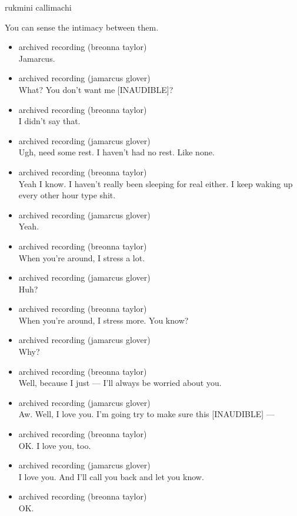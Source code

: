 rukmini callimachi

You can sense the intimacy between them.

\begin{itemize}
\item
  archived recording (breonna taylor)\\
  Jamarcus.
\item
  archived recording (jamarcus glover)\\
  What? You don't want me {[}INAUDIBLE{]}?
\item
  archived recording (breonna taylor)\\
  I didn't say that.
\item
  archived recording (jamarcus glover)\\
  Ugh, need some rest. I haven't had no rest. Like none.
\item
  archived recording (breonna taylor)\\
  Yeah I know. I haven't really been sleeping for real either. I keep
  waking up every other hour type shit.
\item
  archived recording (jamarcus glover)\\
  Yeah.
\item
  archived recording (breonna taylor)\\
  When you're around, I stress a lot.
\item
  archived recording (jamarcus glover)\\
  Huh?
\item
  archived recording (breonna taylor)\\
  When you're around, I stress more. You know?
\item
  archived recording (jamarcus glover)\\
  Why?
\item
  archived recording (breonna taylor)\\
  Well, because I just --- I'll always be worried about you.
\item
  archived recording (jamarcus glover)\\
  Aw. Well, I love you. I'm going try to make sure this {[}INAUDIBLE{]}
  ---
\item
  archived recording (breonna taylor)\\
  OK. I love you, too.
\item
  archived recording (jamarcus glover)\\
  I love you. And I'll call you back and let you know.
\item
  archived recording (breonna taylor)\\
  OK.
\end{itemize}

